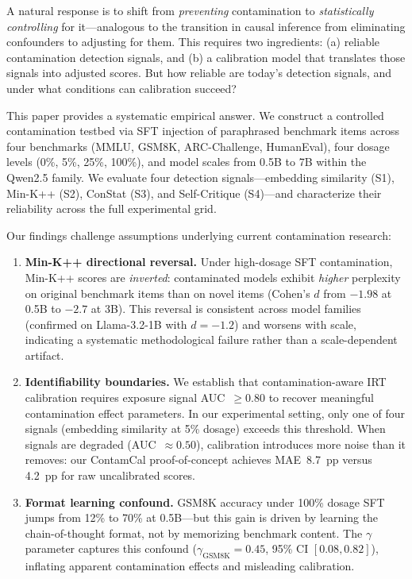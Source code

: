 \documentclass[11pt]{article}
\begin{document}
A natural response is to shift from \emph{preventing} contamination to \emph{statistically controlling} for it---analogous to the transition in causal inference from eliminating confounders to adjusting for them.
This requires two ingredients: (a) reliable contamination detection signals, and (b) a calibration model that translates those signals into adjusted scores.
But how reliable are today's detection signals, and under what conditions can calibration succeed?

This paper provides a systematic empirical answer.
We construct a controlled contamination testbed via SFT injection of paraphrased benchmark items across four benchmarks (MMLU, GSM8K, ARC-Challenge, HumanEval), four dosage levels (0\%, 5\%, 25\%, 100\%), and model scales from 0.5B to 7B within the Qwen2.5 family.
We evaluate four detection signals---embedding similarity (S1), Min-K++ (S2), ConStat (S3), and Self-Critique (S4)---and characterize their reliability across the full experimental grid.

Our findings challenge assumptions underlying current contamination research:

\begin{enumerate}
\item \textbf{Min-K++ directional reversal.} Under high-dosage SFT contamination, Min-K++ scores are \emph{inverted}: contaminated models exhibit \emph{higher} perplexity on original benchmark items than on novel items (Cohen's $d$ from $-1.98$ at 0.5B to $-2.7$ at 3B). This reversal is consistent across model families (confirmed on Llama-3.2-1B with $d = -1.2$) and worsens with scale, indicating a systematic methodological failure rather than a scale-dependent artifact.

\item \textbf{Identifiability boundaries.} We establish that contamination-aware IRT calibration requires exposure signal AUC~$\geq 0.80$ to recover meaningful contamination effect parameters. In our experimental setting, only one of four signals (embedding similarity at 5\% dosage) exceeds this threshold. When signals are degraded (AUC~$\approx 0.50$), calibration introduces more noise than it removes: our ContamCal proof-of-concept achieves MAE~8.7~pp versus 4.2~pp for raw uncalibrated scores.

\item \textbf{Format learning confound.} GSM8K accuracy under 100\% dosage SFT jumps from 12\% to 70\% at 0.5B---but this gain is driven by learning the chain-of-thought format, not by memorizing benchmark content. The $\gamma$ parameter captures this confound ($\gamma_{\text{GSM8K}} = 0.45$, 95\% CI $[0.08, 0.82]$), inflating apparent contamination effects and misleading calibration.
\end{enumerate}
\end{document}

